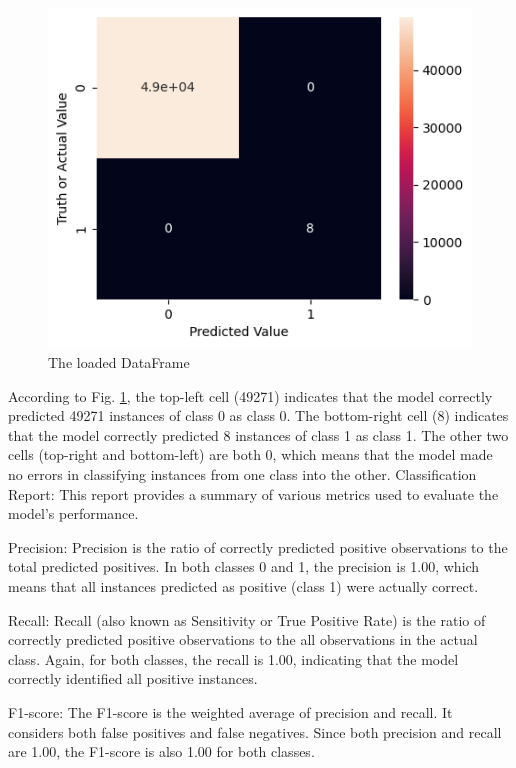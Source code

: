 \begin{figure}[htb]
	\includegraphics[width=\textwidth]{resources/confusion.png}
	\caption{The loaded DataFrame}
	\label{fig:confusion}
\end{figure}


According to Fig. \ref{fig:confusion}, the top-left cell (49271) indicates that the model correctly predicted 49271 instances of class 0 as class 0.
The bottom-right cell (8) indicates that the model correctly predicted 8 instances of class 1 as class 1.
The other two cells (top-right and bottom-left) are both 0, which means that the model made no errors in classifying instances from one class into the other.
Classification Report:
This report provides a summary of various metrics used to evaluate the model's performance.

Precision: Precision is the ratio of correctly predicted positive observations to the total predicted positives. In both classes 0 and 1, the precision is 1.00, which means that all instances predicted as positive (class 1) were actually correct.

Recall: Recall (also known as Sensitivity or True Positive Rate) is the ratio of correctly predicted positive observations to the all observations in the actual class. Again, for both classes, the recall is 1.00, indicating that the model correctly identified all positive instances.

F1-score: The F1-score is the weighted average of precision and recall. It considers both false positives and false negatives. Since both precision and recall are 1.00, the F1-score is also 1.00 for both classes.

